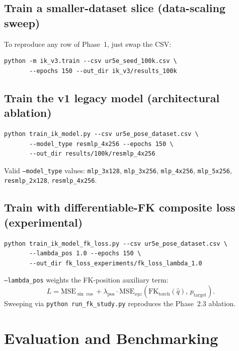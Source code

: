 \documentclass[11pt]{article}
\begin{document}
\subsection{Train a smaller-dataset slice (data-scaling sweep)}

To reproduce any row of Phase~1, just swap the CSV:

\begin{lstlisting}[style=shell]
python -m ik_v3.train --csv ur5e_seed_100k.csv \
       --epochs 150 --out_dir ik_v3/results_100k
\end{lstlisting}

\subsection{Train the v1 legacy model (architectural ablation)}

\begin{lstlisting}[style=shell]
python train_ik_model.py --csv ur5e_pose_dataset.csv \
       --model_type resmlp_4x256 --epochs 150 \
       --out_dir results/100k/resmlp_4x256
\end{lstlisting}

\noindent Valid \texttt{--model\_type} values: \texttt{mlp\_3x128},
\texttt{mlp\_3x256}, \texttt{mlp\_4x256}, \texttt{mlp\_5x256},
\texttt{resmlp\_2x128}, \texttt{resmlp\_4x256}.

\subsection{Train with differentiable-FK composite loss (experimental)}

\begin{lstlisting}[style=shell]
python train_ik_model_fk_loss.py --csv ur5e_pose_dataset.csv \
       --lambda_pos 1.0 --epochs 150 \
       --out_dir fk_loss_experiments/fk_loss_lambda_1.0
\end{lstlisting}

\noindent\texttt{--lambda\_pos} weights the FK-position auxiliary term:
\[
L = \mathrm{MSE}_{\sin\cos} + \lambda_\text{pos}\cdot
    \mathrm{MSE}_{xyz}\!\left(\mathrm{FK}_{\mathrm{torch}}(\hat q),\, p_\text{target}\right).
\]
Sweeping via \texttt{python run\_fk\_study.py} reproduces the Phase~2.3
ablation.

\section{Evaluation and Benchmarking}
\end{document}
